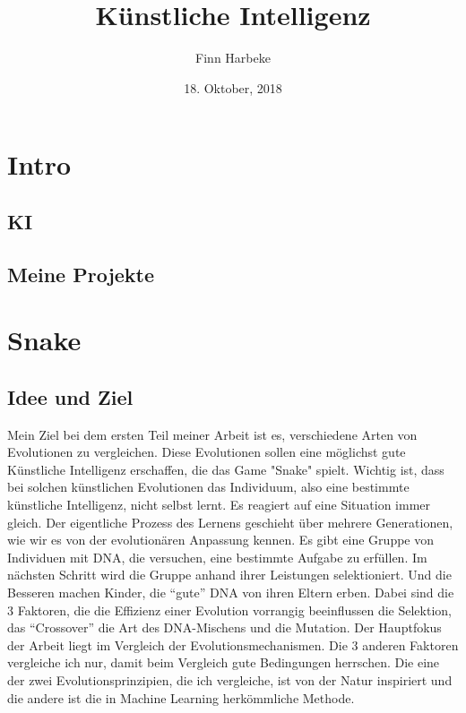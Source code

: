 \documentclass[10pt,a4paper,ngerman,english]{article}
\author{Finn Harbeke}
\title{Künstliche Intelligenz}
\date{18. Oktober, 2018}
\begin{document}
\maketitle
\tableofcontents
\pagebreak

\section{Intro}

\subsection{KI}

\subsection{Meine Projekte}

\section{Snake}

\subsection{Idee und Ziel}
Mein Ziel bei dem ersten Teil meiner Arbeit ist es, verschiedene Arten von Evolutionen zu vergleichen. Diese Evolutionen sollen eine möglichst gute Künstliche Intelligenz erschaffen, die das Game "Snake" spielt. Wichtig ist, dass bei solchen künstlichen Evolutionen das Individuum, also eine bestimmte künstliche Intelligenz, nicht selbst lernt. Es reagiert auf eine Situation immer gleich. Der eigentliche Prozess des Lernens geschieht über mehrere Generationen, wie wir es von der evolutionären Anpassung kennen. Es gibt eine Gruppe von Individuen mit DNA, die versuchen, eine bestimmte Aufgabe zu erfüllen. Im nächsten Schritt wird die Gruppe anhand ihrer Leistungen selektioniert. Und die Besseren machen Kinder, die \enquote{gute} DNA von ihren Eltern erben. Dabei sind die 3 Faktoren, die die Effizienz einer Evolution vorrangig beeinflussen die Selektion, das \enquote{Crossover} die Art des DNA-Mischens und die Mutation. Der Hauptfokus der Arbeit liegt im Vergleich der Evolutionsmechanismen. Die 3 anderen Faktoren vergleiche ich nur, damit beim Vergleich gute Bedingungen herrschen. Die eine der zwei Evolutionsprinzipien, die ich vergleiche, ist von der Natur inspiriert und die andere ist die in Machine Learning herkömmliche Methode.
\end{document}
